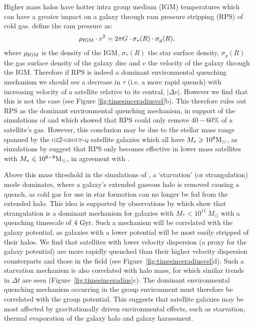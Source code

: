 \documentclass[useAMS,usenatbib]{mn2e}
\def\minor		{\color{minorcol}}
\begin{document}
Higher mass halos have hotter intra group medium (IGM) temperatures \citep{shimizu03, delpopolo05} which can have a greater impact on a galaxy through ram pressure stripping (RPS) of cold gas. \cite{gunngott72} define the ram pressure as:
\begin{equation}\label{eq:rps}
\rho_{\rm{IGM}}\cdot v^2 = 2\pi G \cdot \sigma_*(R) \cdot \sigma_g(R),
\end{equation}
where $\rho_{\rm{IGM}}$ is the density of the IGM, $\sigma_*(R)$ the star surface density, $\sigma_g(R)$ the gas surface density of the galaxy disc and $v$ the velocity of the galaxy through the IGM. Therefore if RPS is indeed a dominant environmental quenching mechanism we should see a {\minor decrease in $\tau$ (i.e. a more rapid quench) with increasing} velocity of a satellite relative to its central, $|\Delta v|$.  However we find that this is not the case (see {\minor Figure \ref{fig:timesinceradiusvel}b}). This therefore rules out RPS as the dominant environmental quenching mechanism, in support of the simulations of \citet{emerick16} and \citet{fillingham16} which showed that RPS could only remove $40-60\%$ of a satellite's gas. However, this conclusion may be due to the stellar mass range spanned by the \textsc{gz2-group-q} satellite galaxies which all have $M_* \geq 10^9 \rm{M}_{\odot}$, as simulations by \cite{fillingham16} suggest that RPS only becomes effective in lower mass satellites with $M_* \leq 10^{8-9} \rm{M}_{\odot}$, in agreement with \cite{hester06}. 

Above this mass threshold in the simulations of \cite{fillingham16}, a `starvation' (or strangulation) mode \citep{larson80, balogh00} dominates, where a galaxy's extended gaseous halo is removed causing a quench, as cold gas for use in star formation can no longer be fed from the extended halo. This idea is supported by observations by {\minor\citet{peng15}} which show that strangulation is a dominant mechanism for galaxies with $M_* < 10^{11}~M_{\odot}$ with a quenching timescale of $4~\rm{Gyr}.$ Such a mechanism will be correlated with the galaxy potential, as galaxies with a lower potential will be most easily stripped of their halos. We find that satellites with lower velocity dispersion (a proxy for the galaxy potential) are more rapidly quenched than their higher velocity dispersion counterparts and those in the field (see Figure~\ref{fig:timesinceradiusvel}d). Such a starvation mechanism is also correlated with halo mass, for which similar trends in $\Delta t$ are seen (Figure~\ref{fig:timesinceradius}c). The dominant environmental quenching mechanism occurring in the group environment must therefore be correlated with the group potential. This suggests that satellite galaxies may be most affected by gravitationally driven environmental effects, such as starvation, thermal evaporation of the galaxy halo and galaxy harassment. 
\end{document}
